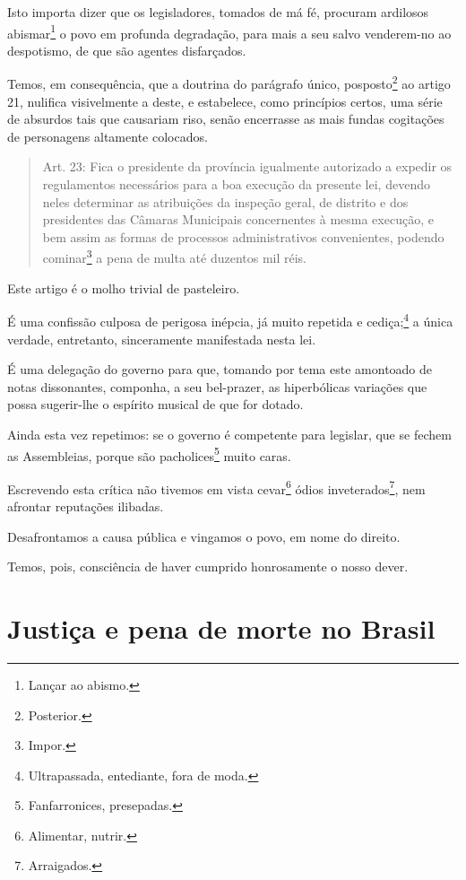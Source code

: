 Isto importa dizer que os legisladores, tomados de má fé, procuram
ardilosos abismar\footnote{Lançar ao abismo.} o povo em profunda
degradação, para mais a seu salvo venderem-no ao despotismo, de que são
agentes disfarçados.

Temos, em consequência, que a doutrina do parágrafo único,
posposto\footnote{Posterior.} ao artigo 21, nulifica visivelmente a
deste, e estabelece, como princípios certos, uma série de absurdos tais
que causariam riso, senão encerrasse as mais fundas cogitações de
personagens altamente colocados.

\begin{quote}
Art. 23: Fica o presidente da província igualmente autorizado a expedir
os regulamentos necessários para a boa execução da presente lei, devendo
neles determinar as atribuições da inspeção geral, de distrito e dos
presidentes das Câmaras Municipais concernentes à mesma execução, e bem
assim as formas de processos administrativos convenientes, podendo
cominar\footnote{Impor.} a pena de multa até duzentos mil réis.
\end{quote}

Este artigo é o molho trivial de pasteleiro.

É uma confissão culposa de perigosa inépcia, já muito repetida e
cediça;\footnote{Ultrapassada, entediante, fora de moda.} a única
verdade, entretanto, sinceramente manifestada nesta lei.

É uma delegação do governo para que, tomando por tema este amontoado de
notas dissonantes, componha, a seu bel-prazer, as hiperbólicas variações
que possa sugerir-lhe o espírito musical de que for dotado.

Ainda esta vez repetimos: se o governo é competente para legislar, que
se fechem as Assembleias, porque são pacholices\footnote{
  Fanfarronices, presepadas.} muito caras.

Escrevendo esta crítica não tivemos em vista cevar\footnote{Alimentar,
  nutrir.} ódios inveterados\footnote{Arraigados.}, nem afrontar
reputações ilibadas.

Desafrontamos a causa pública e vingamos o povo, em nome do direito.

Temos, pois, consciência de haver cumprido honrosamente o nosso dever.

\part{Justiça e pena de morte no Brasil} %

